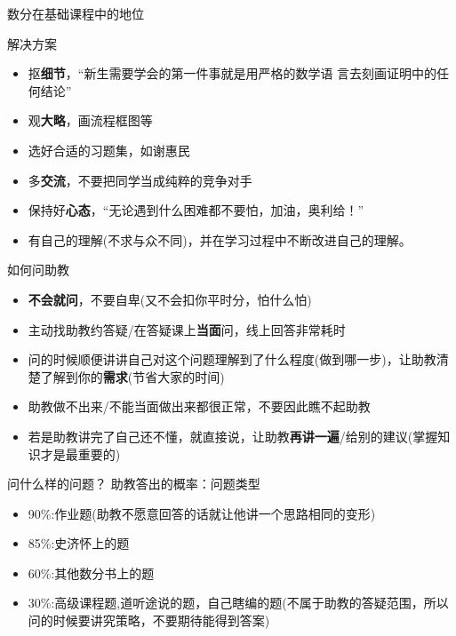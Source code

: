 \documentclass[pdf]{beamer}
\numberwithin{equation}{section}
\theoremstyle{plain}
\theoremstyle{plain}
\theoremstyle{plain}
\theoremstyle{remark}
\begin{document}
\begin{frame}{数分在基础课程中的地位}
\end{frame}

\begin{frame}{解决方案}

\begin{itemize}
	\item 抠\textbf{细节}，“新生需要学会的第一件事就是用严格的数学语
言去刻画证明中的任何结论”
	\item 观\textbf{大略}，画流程框图等
	\item 选好合适的习题集，如谢惠民
	\item 多\textbf{交流}，不要把同学当成纯粹的竞争对手
	\item 保持好\textbf{心态}，“无论遇到什么困难都不要怕，加油，奥利给！”
	\item 有自己的理解(不求与众不同)，并在学习过程中不断改进自己的理解。
\end{itemize}
\end{frame}

\begin{frame}{如何问助教}
\begin{itemize}
	\item \textbf{不会就问}，不要自卑(又不会扣你平时分，怕什么怕)
	\item 主动找助教约答疑/在答疑课上\textbf{当面}问，线上回答非常耗时
	\item 问的时候顺便讲讲自己对这个问题理解到了什么程度(做到哪一步)，让助教清楚了解到你的\textbf{需求}(节省大家的时间)
	\item 助教做不出来/不能当面做出来都很正常，不要因此瞧不起助教
	\item 若是助教讲完了自己还不懂，就直接说，让助教\textbf{再讲一遍}/给别的建议(掌握知识才是最重要的)
\end{itemize}
\end{frame}
\begin{frame}{问什么样的问题？}
助教答出的概率：问题类型
\begin{itemize}
\item 90\%:作业题(助教不愿意回答的话就让他讲一个思路相同的变形)
\item 85\%:史济怀上的题
\item 60\%:其他数分书上的题
\item 30\%:高级课程题,道听途说的题，自己瞎编的题(不属于助教的答疑范围，所以问的时候要讲究策略，不要期待能得到答案)
\end{itemize}
\end{frame}
\end{document}
